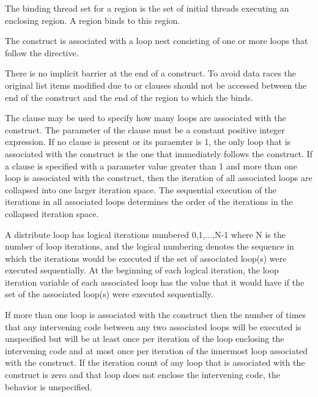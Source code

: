 \begin{samepage}

\binding
The binding thread set for a  region is the set of initial
threads executing an enclosing  region. A  region
binds to this  region.

\descr
The  construct is associated with a loop nest consisting of 
one or more loops that follow the directive.

There is no implicit barrier at the end of a  construct.
To avoid data races the original list items modified due to  
or  clauses should not be accessed between the end of the 
 construct and the end of the  region to which 
the  binds.

\end{samepage}

The  clause may be used to specify how many loops are
associated with the  construct.  The parameter of the
 clause must be a constant positive integer expression.
If no  clause is present or its paraemter is 1, the
only loop that is associated with the  construct is
the one that immediately follows the  construct.  If
a  clause is specified with a parameter value greater
than 1 and more than one loop is associated with the 
construct, then the iteration of all associated loops are collapsed
into one larger iteration space.  The sequential execution of the
iterations in all associated loops determines the order of the
iterations in the collapsed iteration space.

A distribute loop has logical iterations numbered 0,1,...,N-1 where N
is the number of loop iterations, and the logical numbering denotes
the sequence in which the iterations would be executed if the set of
associated loop(s) were executed sequentially.  At the beginning of
each logical iteration, the loop iteration variable of each associated
loop has the value that it would have if the set of the associated
loop(s) were executed sequentially.

If more than one loop is associated with the 
construct then the number of times that any intervening code between
any two associated loops will be executed is unspecified but will be
at least once per iteration of the loop enclosing the intervening code
and at most once per iteration of the innermost loop associated with
the construct.  If the iteration count of any loop that is associated 
with the  construct is zero and that loop does not 
enclose the intervening code, the behavior is unspecified.

